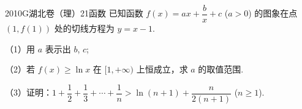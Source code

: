 
\begin{problem}{2010}{G}{湖北卷（理）}{21}{函数}
已知函数 $f(x)=ax+\dfrac{b}{x}+c$ ($a>0$) 的图象在点 $(1,f(1))$ 处的切线方程为 $y=x-1$.

（1）用 $a$ 表示出 $b$, $c$;

（2）若 $f(x)\geqslant\ln x$ 在 $[1,+\infty)$ 上恒成立，求 $a$ 的取值范围.

（3）证明：$1+\dfrac{1}{2}+\dfrac{1}{3}+\cdots+\dfrac{1}{n}>\ln(n+1)+\dfrac{n}{2(n+1)}$ ($n\geqslant1$).
\end{problem}